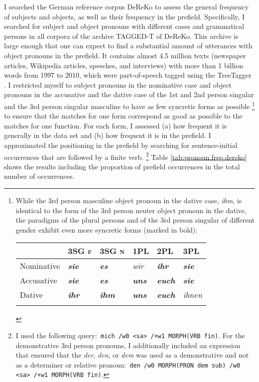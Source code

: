 I searched the German reference corpus DeReKo \citep{dereko2022} to assess the general frequency of subjects and objects, as well as their frequency in the prefield. 
Specifically, I searched for subject and object pronouns with different cases and grammatical persons in all corpora of the archive TAGGED-T of  DeReKo.
This archive is large enough that one can expect to find a substantial amount of utterances with object pronouns in the prefield.
It contains almost 4.5 million texts (newspaper articles, Wikipedia articles, speeches, and interviews) with more than 1 billion words from 1997 to 2010, which were part-of-speech tagged using the TreeTagger \citep{schmid1994, schmid1995}.
I restricted myself to subject pronouns in the nominative  case and object pronouns in the accusative  and the dative  case of the 1st and 2nd person singular and the 3rd person singular masculine to have as few syncretic  forms as possible%
\footnote{While the 3rd person masculine object pronoun in the dative  case, \textit{ihm}, is identical to the form of the 3rd person neuter object pronoun in the dative, the paradigms of the plural persons and of the 3rd person singular of different gender exhibit even more syncretic  forms (marked in bold):

\begin{tabular}{llllll}
\lsptoprule
& 3SG \textsc{f} & 3SG \textsc{n} & 1PL & 2PL & 3PL \\
\midrule
Nominative & \textbf{\textit{sie}} & \textbf{\textit{es}} & \textit{wir} & \textbf{\textit{ihr}} & \textbf{\textit{sie}} \\
Accusative & \textbf{\textit{sie}} & \textbf{\textit{es}} & \textbf{\textit{uns}} & \textbf{\textit{euch}} & \textbf{\textit{sie}} \\
Dative & \textbf{\textit{ihr}} & \textbf{\textit{ihm}} & \textbf{\textit{uns}} & \textbf{\textit{euch}} & \textit{ihnen}\\
\lspbottomrule
\end{tabular}\bigskip

}
%
to ensure that the matches for one form correspond as good as possible to the matches for one function.
For each form, I assessed (a) how frequent it is generally in the data set and (b) how frequent it is in the prefield.
I approximated the positioning in the prefield by searching for sentence-initial occurrences that are followed by a finite verb.%
\footnote{I used the following query:\texttt{ mich /w0 <sa> /+w1 MORPH(VRB fin)}. 
For the demonstrative 3rd person pronouns, I additionally included an expression that ensured that the \textit{der}, \textit{den}, or \textit{dem} was used as a demonstrative and not as a determiner or relative pronoun:\texttt{ den /w0 MORPH(PRON dem sub) /w0 <sa> /+w1 MORPH(VRB fin)}.
}
Table \ref{tab:pronoun.freq.dereko} shows the results including the proportion of prefield occurrences in the total number of occurrences.

